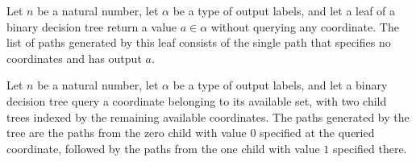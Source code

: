 \begin{theorem}
\leanok
{}
Let $n$ be a natural number, let $\alpha$ be a type of output labels, and let a leaf of
a binary decision tree return a value $a\in\alpha$ without querying any coordinate. The
list of paths generated by this leaf consists of the single path that specifies no
coordinates and has output $a$.
\end{theorem}

\begin{theorem}
\leanok
{}
Let $n$ be a natural number, let $\alpha$ be a type of output labels, and let a binary
decision tree query a coordinate belonging to its available set, with two child trees
indexed by the remaining available coordinates. The paths generated by the tree are the
paths from the zero child with value $0$ specified at the queried coordinate, followed
by the paths from the one child with value $1$ specified there.
\end{theorem}

